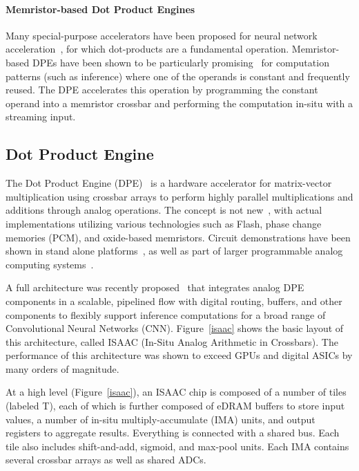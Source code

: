 \paragraph{Memristor-based Dot Product Engines} Many special-purpose
accelerators have been proposed for neural network
acceleration~\cite{chen2014dadiannao,chi2016prime,shafiee2016isaac}, for which
dot-products are a fundamental operation.  Memristor-based DPEs have been shown
to be particularly promising~\cite{shafiee2016isaac} for computation patterns
(such as inference) where one of the operands is constant and frequently
reused.  The DPE accelerates this operation by programming the constant operand
into a memristor crossbar and performing the computation in-situ with a
streaming input.

\subsection{Dot Product Engine}
\label{sec:DPE}

The Dot Product Engine (DPE)~\cite{hu2016dot} is a hardware accelerator for
matrix-vector multiplication using crossbar arrays to perform highly parallel
multiplications and additions through analog operations.  The concept is not
new~\cite{steinbuch1961lernmatrix,likharev2011crossnets}, with actual
implementations utilizing various technologies such as Flash, phase change
memories (PCM), and oxide-based memristors.  Circuit demonstrations have been
shown in stand alone platforms~\cite{prezioso2015training}, as well as part of
larger programmable analog computing systems~\cite{george2016programmable}.

A full architecture was recently proposed~\cite{shafiee2016isaac} that
integrates analog DPE components in a scalable, pipelined flow with digital
routing, buffers, and other components to flexibly support inference
computations for a broad range of Convolutional Neural Networks (CNN).
Figure~\ref{isaac} shows the basic layout of this architecture, called ISAAC
(In-Situ Analog Arithmetic in Crossbars).  The performance of this architecture
was shown to exceed GPUs and digital ASICs by many orders of magnitude.

At a high level (Figure~\ref{isaac}), an ISAAC chip is composed of a number of
tiles (labeled T), each of which is further composed of eDRAM buffers to store
input values, a number of in-situ multiply-accumulate (IMA) units, and output
registers to aggregate results.  Everything is connected with a shared bus.
Each tile also includes shift-and-add, sigmoid, and max-pool units.  Each IMA
contains several crossbar arrays as well as shared ADCs.

